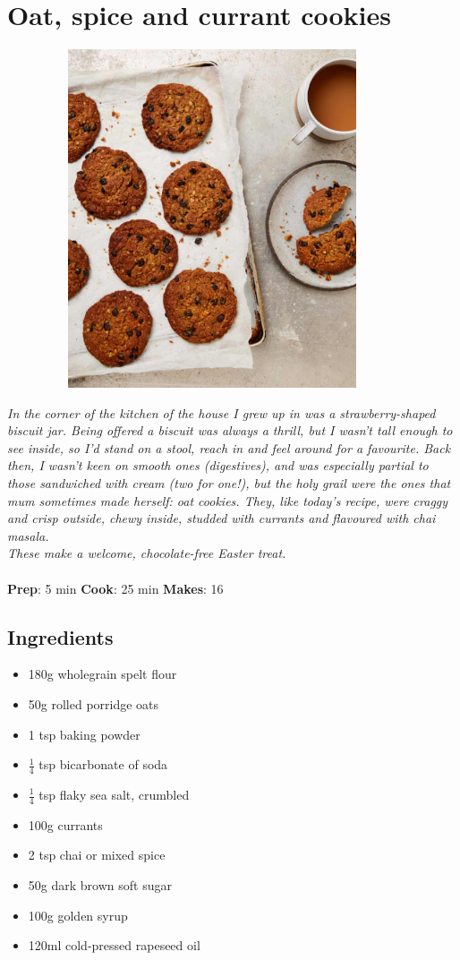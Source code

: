 \documentclass{book}
\begin{document}
\section{Oat, spice and currant cookies}
\begin{figure}
\centering\includegraphics[width=10cm,height=10cm,keepaspectratio]{Recipe_Pictures/Oat,_spice_and_currant_cookies.png}
\end{figure}
\emph{In the corner of the kitchen of the house I grew up in was a strawberry-shaped biscuit jar. Being offered a biscuit was always a thrill, but I wasn’t tall enough to see inside, so I’d stand on a stool, reach in and feel around for a favourite. Back then, I wasn’t keen on smooth ones (digestives), and was especially partial to those sandwiched with cream (two for one!), but the holy grail were the ones that mum sometimes made herself: oat cookies. They, like today’s recipe, were craggy and crisp outside, chewy inside, studded with currants and flavoured with chai masala.\\ 
These make a welcome, chocolate-free Easter treat.}\\\\ 
\textbf{Prep}: 5 min
\textbf{Cook}: 25 min
\textbf{Makes}: 16
\subsection*{Ingredients}
\begin{itemize}
\item 180g wholegrain spelt flour 
\item 50g rolled porridge oats 
\item 1 tsp baking powder 
\item $\frac{1}{4}$ tsp bicarbonate of soda 
\item $\frac{1}{4}$ tsp flaky sea salt, crumbled 
\item 100g currants 
\item 2 tsp chai or mixed spice
\item 50g dark brown soft sugar 
\item 100g golden syrup
\item 120ml cold-pressed rapeseed oil
\end{itemize}
\end{document}
